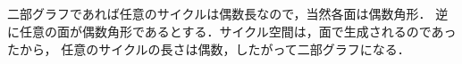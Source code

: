 \subsection{}
二部グラフであれば任意のサイクルは偶数長なので，当然各面は偶数角形．
逆に任意の面が偶数角形であるとする．サイクル空間は，面で生成されるのであったから，
任意のサイクルの長さは偶数，したがって二部グラフになる．